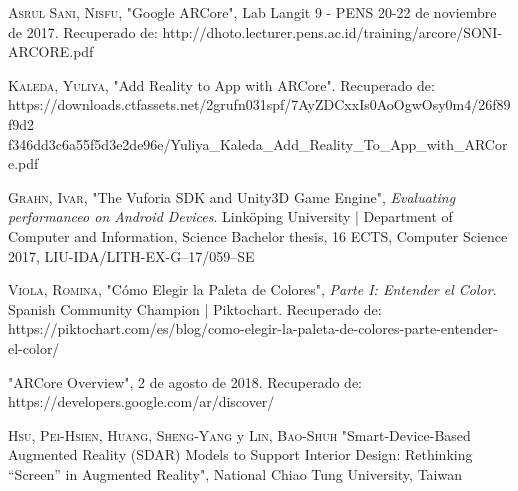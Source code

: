 \begin{thebibliography}{X}
	 \textsc{Asrul Sani, Nisfu}, "Google ARCore", Lab Langit 9 - PENS 20-22 de noviembre de 2017. Recuperado de: http://dhoto.lecturer.pens.ac.id/training/arcore/SONI-ARCORE.pdf
	
	 \textsc{Kaleda, Yuliya}, "Add Reality to App with ARCore". Recuperado de: https://downloads.ctfassets.net/2grufn031spf/7AyZDCxxIs0AoOgwOsy0m4/26f89f9d2
	f346dd3c6a55f5d3e2de96e/Yuliya\_Kaleda\_Add\_Reality\_To\_App\_with\_ARCore.pdf
	
	 \textsc{Grahn, Ivar}, "The Vuforia SDK and Unity3D Game Engine", \textit{Evaluating performanceo on Android Devices}. Linköping University | Department of Computer and Information, Science Bachelor thesis, 16 ECTS, Computer Science 2017, LIU-IDA/LITH-EX-G–17/059–SE
	
	 \textsc{Viola, Romina}, "Cómo Elegir la Paleta de Colores", \textit{Parte I: Entender el Color}. Spanish Community Champion | Piktochart. Recuperado de: https://piktochart.com/es/blog/como-elegir-la-paleta-de-colores-parte-entender-el-color/
	
	 "ARCore Overview", 2 de agosto de 2018. Recuperado de: https://developers.google.com/ar/discover/
	
	 \textsc{Hsu, Pei-Hsien}, \textsc{Huang, Sheng-Yang} y \textsc{Lin, Bao-Shuh} "Smart-Device-Based Augmented Reality (SDAR) Models to Support Interior Design: Rethinking “Screen” in Augmented Reality", National Chiao Tung University, Taiwan
	
	
\end{thebibliography}
